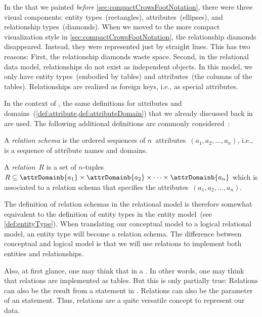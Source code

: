 %
\label{sec:relationalModel}%
%
In the  that we painted \emph{before} \cref{sec:compactCrowsFootNotation}, there were three visual components:
entity types~(rectangles), attributes~(ellipses), and relationship types~(diamonds).
When we moved to the more compact visualization style in \cref{sec:compactCrowsFootNotation}, the relationship diamonds disappeared.
Instead, they were represented just by straight lines.
This has two reasons:
First, the relationship diamonds waste space.
Second, in the relational data model, relationships do not exist as independent objects.
In this model, we only have entity types~(embodied by tables) and attributes~(the columns of the tables).
Relationships are realized as foreign keys, i.e., as special attributes.

In the context of , the same definitions for attributes and domains~(\cref{def:attribute,def:attributeDomain}) that we already discussed back in  are used.
The following additional definitions are commonly considered~\cite{C1970ARMODFLSDB}:%
%
\begin{definition}%
\sloppy%
A \emph{relation schema} is the ordered sequences of $n$~attributes~$(a_1, a_2, \dots, a_n)$, i.e., is a sequence of attribute names and domains.%
\end{definition}%
\fussy%
%
\begin{definition}[Relation]%
\label{def:rdb:relation}%
A \emph{relation}~$R$ is a set of $n$\nobreakdashes-tuples $R\subseteq\attrDomainb{a_1}\times\attrDomainb{a_2}\times\dots\times\attrDomainb{a_n}$ which is associated to a relation schema that specifies the attributes~$(a_1, a_2, \dots, a_n)$.%
\end{definition}%
%
The definition of relation schemas in the relational model is therefore somewhat equivalent to the definition of entity types in the entity model~(see \cref{def:entityType}).
When translating our conceptual model to a logical relational model, an entity type will become a relation schema.
The difference between conceptual and logical model is that we will use relations to implement both entities and relationships.

Also, at first glance, one may think that  in a \db.
In other words, one may think that relations are implemented as tables.
But this is only partially true:
Relations can also be the result from a  statement in \sql.
Relations can also be the parameter of an  statement.
Thus, relations are a quite versatile concept to represent our data.

